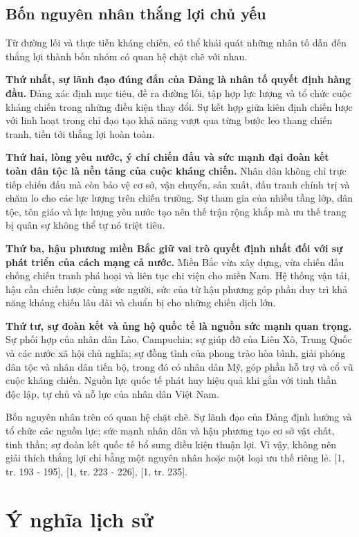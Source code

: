 \subsection{Bốn nguyên nhân thắng lợi chủ yếu}

Từ đường lối và thực tiễn kháng chiến, có thể khái quát những nhân tố dẫn đến thắng lợi thành bốn nhóm có quan hệ chặt chẽ với nhau.

\textbf{Thứ nhất, sự lãnh đạo đúng đắn của Đảng là nhân tố quyết định hàng đầu.} Đảng xác định mục tiêu, đề ra đường lối, tập hợp lực lượng và tổ chức cuộc kháng chiến trong những điều kiện thay đổi. Sự kết hợp giữa kiên định chiến lược với linh hoạt trong chỉ đạo tạo khả năng vượt qua từng bước leo thang chiến tranh, tiến tới thắng lợi hoàn toàn.

\textbf{Thứ hai, lòng yêu nước, ý chí chiến đấu và sức mạnh đại đoàn kết toàn dân tộc là nền tảng của cuộc kháng chiến.} Nhân dân không chỉ trực tiếp chiến đấu mà còn bảo vệ cơ sở, vận chuyển, sản xuất, đấu tranh chính trị và chăm lo cho các lực lượng trên chiến trường. Sự tham gia của nhiều tầng lớp, dân tộc, tôn giáo và lực lượng yêu nước tạo nên thế trận rộng khắp mà ưu thế trang bị quân sự không thể tự nó triệt tiêu.

\textbf{Thứ ba, hậu phương miền Bắc giữ vai trò quyết định nhất đối với sự phát triển của cách mạng cả nước.} Miền Bắc vừa xây dựng, vừa chiến đấu chống chiến tranh phá hoại và liên tục chi viện cho miền Nam. Hệ thống vận tải, hậu cần chiến lược cùng sức người, sức của từ hậu phương góp phần duy trì khả năng kháng chiến lâu dài và chuẩn bị cho những chiến dịch lớn.

\textbf{Thứ tư, sự đoàn kết và ủng hộ quốc tế là nguồn sức mạnh quan trọng.} Sự phối hợp của nhân dân Lào, Campuchia; sự giúp đỡ của Liên Xô, Trung Quốc và các nước xã hội chủ nghĩa; sự đồng tình của phong trào hòa bình, giải phóng dân tộc và nhân dân tiến bộ, trong đó có nhân dân Mỹ, góp phần hỗ trợ và cổ vũ cuộc kháng chiến. Nguồn lực quốc tế phát huy hiệu quả khi gắn với tinh thần độc lập, tự chủ và nỗ lực của nhân dân Việt Nam.

Bốn nguyên nhân trên có quan hệ chặt chẽ. Sự lãnh đạo của Đảng định hướng và tổ chức các nguồn lực; sức mạnh nhân dân và hậu phương tạo cơ sở vật chất, tinh thần; sự đoàn kết quốc tế bổ sung điều kiện thuận lợi. Vì vậy, không nên giải thích thắng lợi chỉ bằng một nguyên nhân hoặc một loại ưu thế riêng lẻ. [1, tr. 193 - 195], [1, tr. 223 - 226], [1, tr. 235].

\section{Ý nghĩa lịch sử}

